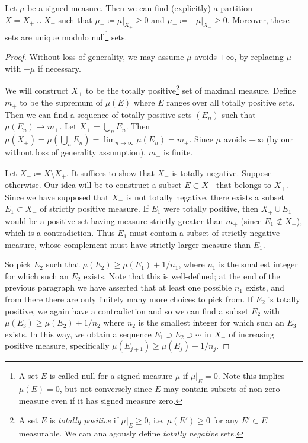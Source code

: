 \documentclass[12pt]{article}
\begin{document}
\begin{theorem}
	Let $\mu$ be a signed measure. Then we can find (explicitly) a partition $X=X_+\cup X_-$ such that $\mu_+\coloneqq\mu|_{X_+}\geq 0$ and $\mu_- \coloneqq -\mu|_{X_-} \geq 0$. Moreover, these sets are unique modulo null\footnote{A set $E$ is called null for a signed measure $\mu$ if $\mu|_E=0$. Note this implies $\mu(E)=0$, but not conversely since $E$ may contain subsets of non-zero measure even if it has signed measure zero.} sets.
\end{theorem}

\begin{proof}
	Without loss of generality, we may assume $\mu$ avoids $+\infty$, by replacing $\mu$ with $-\mu$ if necessary.

	We will construct $X_+$ to be the totally positive\footnote{A set $E$ is \emph{totally positive} if $\mu|_E\geq 0$, i.e. $\mu(E')\geq 0$ for any $E'\subset E$ measurable. We can analagously define \emph{totally negative} sets.} set of maximal measure. Define $m_+$ to be the supremum of $\mu(E)$ where $E$ ranges over all totally positive sets. Then we can find a sequence of totally positive sets $(E_n)$ such that $\mu(E_n)\to m_+$. Let $X_+=\bigcup_n E_n$. Then $\mu(X_+)=\mu(\bigcup_n E_n)=\lim_{n\to\infty}\mu(E_n)=m_+$. Since $\mu$ avoids $+\infty$ (by our without loss of generality assumption), $m_+$ is finite.

	Let $X_-\coloneqq X\setminus X_+$. It suffices to show that $X_-$ is totally negative. Suppose otherwise. Our idea will be to construct a subset $E\subset X_-$ that belongs to $X_+$. Since we have supposed that $X_-$ is not totally negative, there exists a subset $E_1\subset X_-$ of strictly positive measure. If $E_1$ were totally positive, then $X_+\cup E_1$ would be a positive set having measure strictly greater than $m_+$ (since $E_1\not\subset X_+$), which is a contradiction. Thus $E_1$ must contain a subset of strictly negative measure, whose complement must have strictly larger measure than $E_1$. 

	So pick $E_2$ such that $\mu(E_2)\geq \mu(E_1)+1/n_1$, where $n_1$ is the smallest integer for which such an $E_2$ exists. Note that this is well-defined; at the end of the previous paragraph we have asserted that at least one possible $n_1$ exists, and from there there are only finitely many more choices to pick from. If $E_2$ is totally positive, we again have a contradiction and so we can find a subset $E_2$ with $\mu(E_3)\geq\mu(E_2)+1/n_2$ where $n_2$ is the smallest integer for which such an $E_3$ exists. In this way, we obtain a sequence $E_1\supset E_2\supset\cdots$ in $X_-$ of increasing positive measure, specifically $\mu(E_{j+1})\geq\mu(E_j)+1/n_j$.


\end{proof}
\end{document}
